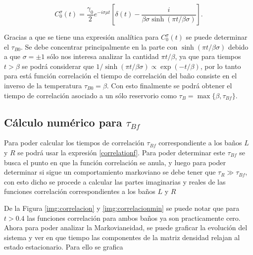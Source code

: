 \begin{appendixs}
\begin{equation*}
    C^{\sigma}_{0}(t) = \frac{\gamma_{0}}{2}e^{-i\sigma \mu t} \left[\delta(t) - \frac{i}{\beta \sigma \sinh(\pi t/\beta \sigma)} \right].
\end{equation*}

Gracias a que se tiene una expresión analítica para $C^{\sigma}_{0}(t)$ se puede determinar el $\tau_{B0}$. Se debe concentrar principalmente en la parte con $\sinh(\pi t/\beta \sigma)$ debido a que $\sigma=\pm 1$ sólo nos interesa analizar la cantidad $\pi t/\beta$, ya que para tiempos $t > \beta$ se podrá considerar que $1/\sinh(\pi t/\beta \sigma) \propto \exp(-t/\beta)$, por lo tanto para está función correlación el tiempo de correlación del baño consiste en el inverso de la temperatura $\tau_{B0} = \beta$. Con esto finalmente se podrá obtener el tiempo de correlación asociado a un sólo reservorio como $\tau_{B} = \max \{\beta,\tau_{Bf} \}$.  

\label{appendix5correlation}

\subsection{Cálculo numérico para $\tau_{Bf}$}
Para poder calcular los tiempos de correlación $\tau_{Bf}$ correspondiente a los baños $L$ y $R$ se podrá usar la expresión \ref{correlationf}. Para poder determinar este $\tau_{Bf}$ se busca el punto en que la función correlación se anula, y luego para poder determinar si sigue un comportamiento markoviano se debe tener que $\tau_{R}\gg \tau_{Bf}$, con esto dicho se procede a calcular las partes imaginarias y reales de las funciones correlación correspondientes a los baños $L$ y $R$ 


De la Figura \ref{img:correlacion} y \ref{img:correlacionmin} se puede notar que para $t>0.4$ las funciones correlación para ambos baños ya son practicamente cero. Ahora para poder analizar la Markovianeidad, se puede graficar la evolución del sistema y ver en que tiempo las componentes de la matriz densidad relajan al estado estacionario. Para ello se grafica 



\end{appendixs}
